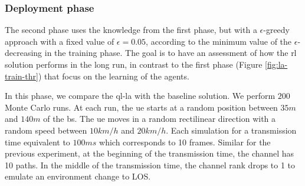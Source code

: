 \subsubsection{Deployment phase}
The second phase uses the knowledge from the first phase, but with a $\epsilon$-greedy approach with a fixed value of $\epsilon = 0.05$, according to the minimum value of the $\epsilon$-decreasing in the training phase.
%
The goal is to have an assessment of how the \gls{rl} solution performs in the long run, in contrast to the first phase (Figure \ref{fig:la-train-thr}) that focus on the learning of the agents.
%

In this phase, we compare the \gls{ql-la} with the baseline solution.
%
We perform $200$ Monte Carlo runs. At each run, the \gls{ue} starts at a random position between $35m$ and $140m$ of the \gls{bs}.
%
The \gls{ue} moves in a random rectilinear direction with a random speed between $10km/h$ and $20km/h$. Each simulation for a transmission time equivalent to $100ms$ which corresponds to 10 frames.
%
Similar for the previous experiment, at the beginning of the transmission time, the channel has 10 paths.
%
In the middle of the transmission time, the channel rank drops to 1 to emulate an environment change to LOS.
%

